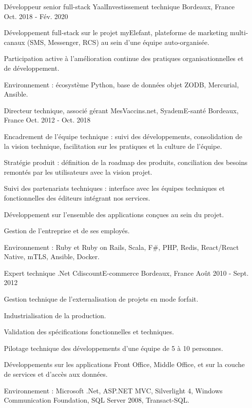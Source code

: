 \begin{cventries}
  \cventry
    {Développeur senior full-stack}
    {Yaal{\enskip\cdotp\enskip}Investissement technique}
    {Bordeaux, France}
    {Oct. 2018 - Fév. 2020}
    {
      \begin{cvitems}
        \item {Développement full-stack sur le projet myElefant, plateforme de marketing multi-canaux (SMS, Messenger, RCS) au sein d'une équipe auto-organisée.}
        \item {Participation active à l'amélioration continue des pratiques organisationnelles et de développement.}
        \item {Environnement : écosystème Python, base de données objet ZODB, Mercurial, Ansible.}
      \end{cvitems}
    }

  \cventry
    {Directeur technique, associé gérant}
    {MesVaccins.net, Syadem{\enskip\cdotp\enskip}E-santé}
    {Bordeaux, France}
    {Oct. 2012 - Oct. 2018}
    {
      \begin{cvitems}
        \item {Encadrement de l'équipe technique : suivi des développements, consolidation de la vision technique, facilitation sur les pratiques et la culture de l'équipe.}
        \item {Stratégie produit : définition de la roadmap des produits, conciliation des besoins remontés par les utilisateurs avec la vision projet.}
        \item {Suivi des partenariats techniques : interface avec les équipes techniques et fonctionnelles des éditeurs intégrant nos services.}
        \item {Développement sur l'ensemble des applications conçues au sein du projet.}
        \item {Gestion de l'entreprise et de ses employés.}
        \item {Environnement : Ruby et Ruby on Rails, Scala, F\#, PHP, Redis, React/React Native, mTLS, Ansible, Docker.}
      \end{cvitems}
    }

  \cventry
    {Expert technique .Net}
    {Cdiscount{\enskip\cdotp\enskip}E-commerce}
    {Bordeaux, France}
    {Août 2010 - Sept. 2012}
    {
      \begin{cvitems}
        \item {Gestion technique de l'externalisation de projets en mode forfait.}
        \item {Industrialisation de la production.}
        \item {Validation des spécifications fonctionnelles et techniques.}
        \item {Pilotage technique des développements d'une équipe de 5 à 10 personnes.}
        \item {Développements sur les applications Front Office, Middle Office, et sur la couche de services et d'accès aux données.}
        \item {Environnement : Microsoft .Net, ASP.NET MVC, Silverlight 4, Windows Communication Foundation, SQL Server 2008, Transact-SQL.}
      \end{cvitems}
    }


\end{cventries}
